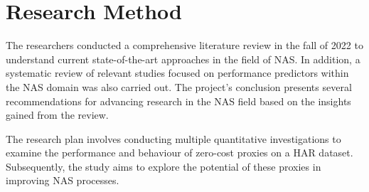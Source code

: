 
\begin{comment}
While theory and analysis can be used for heuristics and rationale when designing models,
modern deep learning is commonly researched through experiments where multiple
alternatives are compared based on relevant metrics.
This thesis employs an experimental research method to study the problem area and
answer the research questions. Generated models from the project experiments are
compared based on pre-specified evaluation criteria on dedicated training and validation
sets to advance the models iteratively. Lastly, the final models are compared and evaluated
on an unseen test set.
\end{comment}

\begin{comment}
    This project is based on a quantitative study where alternative solutions are eval-
uated based on their statistical performance on the relevant problem. Initially,relevant approaches are assessed to gather information about the state-of-the-art methods related to the problem. Based on the analysis of these methods, we hy-
pothesize what can be improved with the given methods and use this as a guideline when proposing our method. Appropriate evaluation metrics are selected before evaluating the proposed method and comparing it with the state-of-the-art approaches, and a dataset on which experiments are performed is acquired. Subsequently, experiments are carried out, and comparisons of the different methods can be obtained. Accordingly, observations and conclusions are extracted from the
experiments.
\end{comment}
\section{Research Method}
The researchers conducted a comprehensive literature review in the fall of 2022 to understand current state-of-the-art approaches in the field of NAS. In addition, a systematic review of relevant studies focused on performance predictors within the NAS domain was also carried out. The project's conclusion presents several recommendations for advancing research in the NAS field based on the insights gained from the review.

The research plan involves conducting multiple quantitative investigations to examine the performance and behaviour of zero-cost proxies on a HAR dataset. Subsequently, the study aims to explore the potential of these proxies in improving NAS processes.


